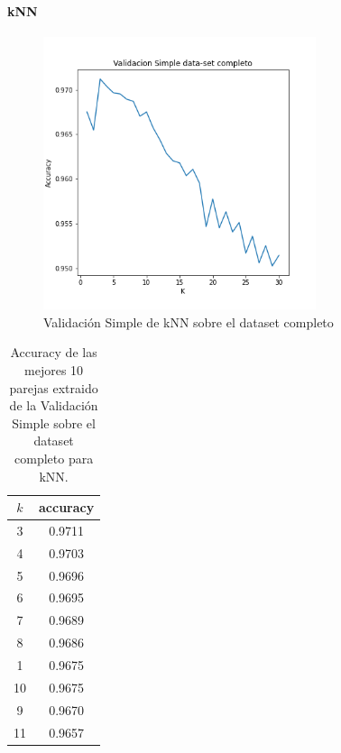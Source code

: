 \paragraph{kNN}


\begin{figure}[H]
    \centering
    \includegraphics[width=8cm]{images/validacionSimple_datasetCompleto.png}%
    \qquad
    \caption{Validación Simple de kNN sobre el dataset completo}
    \label{knn_valSimple}%
\end{figure}

\begin{table}[h!]
    \begin{center}
        \begin{tabular}{|c|c|}
        \hline
        \textbf{$k$} & \textbf{accuracy} \\
        \hline
        3 &  0.9711\\
        4 & 0.9703\\
        5 & 0.9696\\
        6 & 0.9695\\
        7 &  0.9689\\
        8 & 0.9686\\
        1 & 0.9675\\
        10 & 0.9675\\
        9 & 0.9670\\
        11 & 0.9657\\
        
        \hline
        \end{tabular}
        \caption{Accuracy de las mejores 10 parejas extraido de la Validación Simple sobre el dataset completo para kNN.}
        \label{knn_valSimple_table}
    \end{center}
\end{table}

